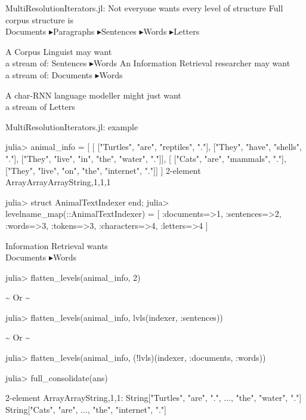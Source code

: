 \documentclass[dvipsnames]{beamer}
\let\oldnote\note
\renewcommand{\note}{\oldnote[item]}
\begin{document}
\def\madeupof{$\blacktriangleright$}
\begin{frame}[fragile]{MultiResolutionIterators.jl: Not everyone wants every level of structure}
	\alert{Full corpus structure} is\\
	Documents \madeupof Paragraphs \madeupof Sentences \madeupof Words \madeupof Letters
	\vfill
	
	A \alert{Corpus Linguist} may want\note{studying word usage}\\
	a stream of: Sentences \madeupof Words
	\vfill
	An \alert{Information Retrieval} researcher may want\\
	a stream of: {Documents} \madeupof {Words}
		
	\vfill
	A \alert{char-RNN} language modeller might just want\\
	a stream of Letters
\end{frame}

\begin{frame}[fragile]{MultiResolutionIterators.jl: example}
	\color{Green}
	\begin{code}
		julia> animal_info = [
		[	["Turtles", "are", "reptiles", "."],
			["They", "have", "shells", "."],
			["They", "live", "in", "the", "water", "."]],
		[	["Cats", "are", "mammals", "."],
			["They", "live", "on", "the", "internet", "."]]
		]
		2-element Array{Array{Array{String,1},1},1}
	\end{code}
	\color{Orange}
	\begin{code}
		julia>  struct AnimalTextIndexer end;
		julia> 	levelname_map(::AnimalTextIndexer) = [
			:documents=>1,
			:sentences=>2,
			:words=>3, :tokens=>3,
			:characters=>4, :letters=>4
		]
	\end{code}

\end{frame}

\newcommand{\ormark}{\vspace{-0.5em}\hfill \textasciitilde{} Or \textasciitilde{} \hfill \null \vspace{-0.5em}}
\begin{frame}[fragile]{Information Retrieval wants\\ {Documents} \madeupof {Words}}
	\color{Purple}
	\small
	\begin{code}
		julia> flatten_levels(animal_info, 2)
	\end{code}
		\ormark{}
	\begin{code}
		julia> flatten_levels(animal_info,
					lvls(indexer, :sentences))
	\end{code}
		\ormark{}
	\begin{code}					
		julia> flatten_levels(animal_info, 
					(!lvls)(indexer, :documents, :words))
	\end{code}
	\color{Green}
	\begin{code}
		julia> full_consolidate(ans)
		
		2-element Array{Array{String,1},1}:
		String["Turtles", "are", ".", ...,  "the", "water", "."]
		String["Cats", "are", ..., "the", "internet", "."]
	\end{code}
\end{frame}
\end{document}
